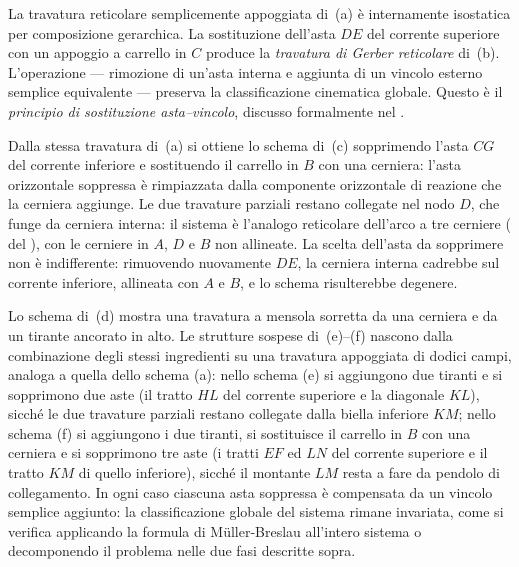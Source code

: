 


La travatura reticolare semplicemente appoggiata di
\,(a) è internamente
isostatica per composizione gerarchica. La sostituzione
dell'asta $DE$ del corrente superiore con un appoggio
a carrello in $C$ produce la \emph{travatura di Gerber
	reticolare} di \,(b).
L'operazione --- rimozione di un'asta interna e
aggiunta di un vincolo esterno semplice equivalente
--- preserva la classificazione cinematica globale.
Questo è il \emph{principio di sostituzione
	asta--vincolo}, discusso formalmente nel
.


Dalla stessa travatura di \,(a)
si ottiene lo schema di \,(c)
sopprimendo l'asta $CG$ del corrente inferiore e
sostituendo il carrello in $B$ con una cerniera:
l'asta orizzontale soppressa è rimpiazzata dalla
componente orizzontale di reazione che la cerniera
aggiunge. Le due travature parziali restano collegate
nel nodo $D$, che funge da cerniera interna: il sistema
è l'analogo reticolare dell'arco a tre cerniere
( del
), con le cerniere in
$A$, $D$ e $B$ non allineate. La scelta dell'asta da
sopprimere non è indifferente: rimuovendo nuovamente
$DE$, la cerniera interna cadrebbe sul corrente
inferiore, allineata con $A$ e $B$, e lo schema
risulterebbe degenere.


Lo schema di \,(d) mostra
una travatura a mensola sorretta da una cerniera e da
un tirante ancorato in alto. Le strutture sospese di
\,(e)--(f) nascono dalla
combinazione degli stessi ingredienti su una travatura
appoggiata di dodici campi, analoga a quella dello
schema (a): nello schema (e) si aggiungono due tiranti
e si sopprimono due aste (il tratto $HL$ del corrente
superiore e la diagonale $KL$), sicché le due travature
parziali restano collegate dalla biella inferiore $KM$;
nello schema (f) si aggiungono i due tiranti, si
sostituisce il carrello in $B$ con una cerniera e si
sopprimono tre aste (i tratti $EF$ ed $LN$ del corrente
superiore e il tratto $KM$ di quello inferiore), sicché
il montante $LM$ resta a fare da pendolo di collegamento.
In ogni caso ciascuna asta soppressa è compensata da un
vincolo semplice aggiunto: la classificazione globale
del sistema rimane invariata, come si verifica applicando
la formula di M\"{u}ller-Breslau all'intero sistema o
decomponendo il problema nelle due fasi descritte sopra.










